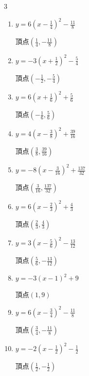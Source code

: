 \begin{multicols}{3}
\begin{enumerate}
  \item $\displaystyle y=6\left( x-\frac{1}{4}\right)^{2}-\frac{11}{8}$

        $\displaystyle 頂点\left( \frac{1}{4} , -\frac{11}{8} \right)$

  \item $\displaystyle y=-3\left( x+\frac{1}{2}\right)^{2}-\frac{5}{4}$

        $\displaystyle 頂点\left( -\frac{1}{2} , -\frac{5}{4} \right)$

  \item $\displaystyle y=6\left( x+\frac{1}{6}\right)^{2}+\frac{5}{6}$

        $\displaystyle 頂点\left( -\frac{1}{6} , \frac{5}{6} \right)$

  \item $\displaystyle y=4\left( x-\frac{3}{8}\right)^{2}+\frac{39}{16}$

        $\displaystyle 頂点\left( \frac{3}{8} , \frac{39}{16} \right)$

  \item $\displaystyle y=-8\left( x-\frac{3}{16}\right)^{2}+\frac{137}{32}$

        $\displaystyle 頂点\left( \frac{3}{16} , \frac{137}{32} \right)$

  \item $\displaystyle y=6\left( x-\frac{2}{3}\right)^{2}+\frac{4}{3}$

        $\displaystyle 頂点\left( \frac{2}{3} , \frac{4}{3} \right)$

  \item $\displaystyle y=3\left( x-\frac{5}{6}\right)^{2}-\frac{13}{12}$

        $\displaystyle 頂点\left( \frac{5}{6} , -\frac{13}{12} \right)$

\columnbreak %

  \item $\displaystyle y=-3\left( x-1\right)^{2}+9$

        $\displaystyle 頂点\left( 1 , 9 \right)$

  \item $\displaystyle y=6\left( x-\frac{3}{4}\right)^{2}-\frac{11}{8}$

        $\displaystyle 頂点\left( \frac{3}{4} , -\frac{11}{8} \right)$

  \item $\displaystyle y=-2\left( x-\frac{1}{2}\right)^{2}-\frac{1}{2}$

        $\displaystyle 頂点\left( \frac{1}{2} , -\frac{1}{2} \right)$


\end{enumerate}
\end{multicols}
